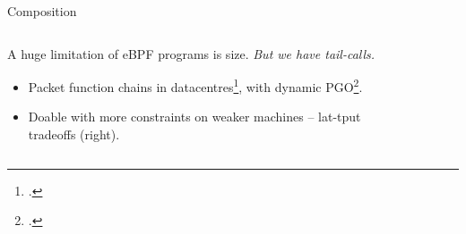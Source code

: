 \documentclass[aspectratio=169,xcolor={dvipsnames}
,handout %
]{beamer}
\begin{document}
\begin{frame}{Composition}
	\begin{columns}
		\begin{column}{0.6\linewidth}
			A huge limitation of eBPF programs is size.
			\emph{But we have \alert{tail-calls}.}
			\begin{itemize}[<+->]
				\item Packet function chains in datacentres\footcite{DBLP:journals/tnsm/MianoRBBL21}, with dynamic PGO\footcite{DBLP:conf/asplos/MianoSRRA22}.
				\item Doable with more constraints on weaker machines -- lat-tput tradeoffs (right).
			\end{itemize}
		\end{column}
		\begin{column}{0.4\linewidth}
			\begin{figure}
				\centering
				\resizebox{0.9\linewidth}{!}{\hspace{-0.9cm}\hspace{-0.2cm}}
			\end{figure}
		\end{column}
	\end{columns}
\end{frame}
\end{document}

